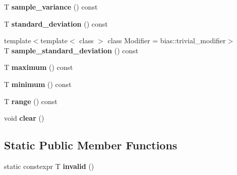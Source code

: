 \begin{DoxyCompactItemize}
T {\bfseries sample\+\_\+variance} () const
\item 
\mbox{\label{classsequoia_1_1maths_1_1statistics_1_1sample_3_01_t_00_010_01_4_a4ee038363deaa5aea8e6210c834b22f5}} 
T {\bfseries standard\+\_\+deviation} () const
\item 
\mbox{\label{classsequoia_1_1maths_1_1statistics_1_1sample_3_01_t_00_010_01_4_a0749d77d5e38923cf11fcdbef2813b1e}} 
{\footnotesize template$<$template$<$ class $>$ class Modifier = bias\+::trivial\+\_\+modifier$>$ }\\T {\bfseries sample\+\_\+standard\+\_\+deviation} () const
\item 
\mbox{\label{classsequoia_1_1maths_1_1statistics_1_1sample_3_01_t_00_010_01_4_a325c6ea634903ac29b5e7e316bdf03ce}} 
T {\bfseries maximum} () const
\item 
\mbox{\label{classsequoia_1_1maths_1_1statistics_1_1sample_3_01_t_00_010_01_4_aff81576fbf01d4ef380298c4924e266f}} 
T {\bfseries minimum} () const
\item 
\mbox{\label{classsequoia_1_1maths_1_1statistics_1_1sample_3_01_t_00_010_01_4_a7c8af5c1f464caed627625e1956cc30f}} 
T {\bfseries range} () const
\item 
\mbox{\label{classsequoia_1_1maths_1_1statistics_1_1sample_3_01_t_00_010_01_4_a9540eaf68cdd3f2a4b930e7fd7774600}} 
void {\bfseries clear} ()
\end{DoxyCompactItemize}
\subsection*{Static Public Member Functions}
\begin{DoxyCompactItemize}
\item 
\mbox{\label{classsequoia_1_1maths_1_1statistics_1_1sample_3_01_t_00_010_01_4_a6d4f4987ae7ee7f12da7dbd9fb753d47}} 
static constexpr T {\bfseries invalid} ()
\end{DoxyCompactItemize}
